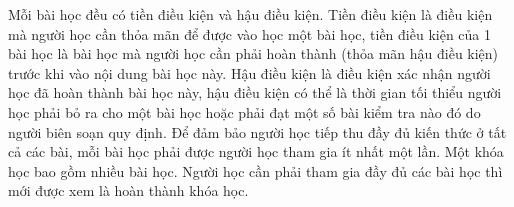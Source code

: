 Mỗi bài học đều có tiền điều kiện và hậu điều kiện. Tiền điều kiện là điều kiện mà người học cần thỏa mãn để được vào học một bài học, tiền điều kiện của 1 bài học là bài học mà người học cần phải hoàn thành (thỏa mãn hậu điều kiện) trước khi vào nội dung bài học này. Hậu điều kiện là điều kiện xác nhận người học đã hoàn thành bài học này, hậu điều kiện có thể là thời gian tối thiểu người học phải bỏ ra cho một bài học hoặc phải đạt một số bài kiểm tra nào đó do người biên soạn quy định. Để đảm bảo người học tiếp thu đầy đủ kiến thức ở tất cả các bài, mỗi bài học phải được người học tham gia ít nhất một lần. Một khóa học bao gồm nhiều bài học. Người học cần phải tham gia đầy đủ các bài học thì mới được xem là hoàn thành khóa học.\\

